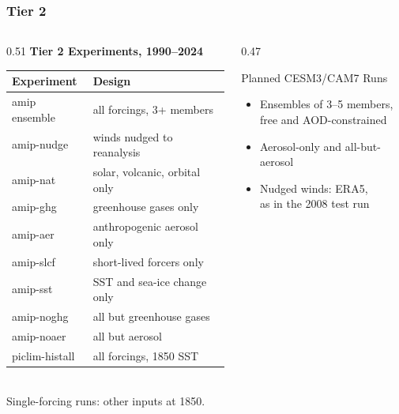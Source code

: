 \begin{frame}[t]
\frametitle{Tier 2}
\footnotesize
\begin{columns}[T]
\begin{column}{0.51\textwidth}
\centering
\textbf{Tier 2 Experiments, 1990--2024}\\[2pt]
{\scriptsize
\begin{tabular}{@{}ll@{}}
\toprule
Experiment & Design \\
\midrule
amip ensemble & all forcings, 3+ members \\
amip-nudge & winds nudged to reanalysis \\
amip-nat & solar, volcanic, orbital only \\
amip-ghg & greenhouse gases only \\
amip-aer & anthropogenic aerosol only \\
amip-slcf & short-lived forcers only \\
amip-sst & SST and sea-ice change only \\
amip-noghg & all but greenhouse gases \\
amip-noaer & all but aerosol \\
piclim-histall & all forcings, 1850 SST \\
\bottomrule
\end{tabular}\\[4pt]
Single-forcing runs: other inputs at 1850.\par}
\end{column}
\begin{column}{0.47\textwidth}
\begin{block}{Planned CESM3/CAM7 Runs}
\begin{itemize}
  \item Ensembles of 3--5 members,\\free and AOD-constrained
  \item Aerosol-only and all-but-aerosol
  \item Nudged winds: ERA5,\\as in the 2008 test run
\end{itemize}

\end{block}
\end{column}
\end{columns}
\end{frame}
